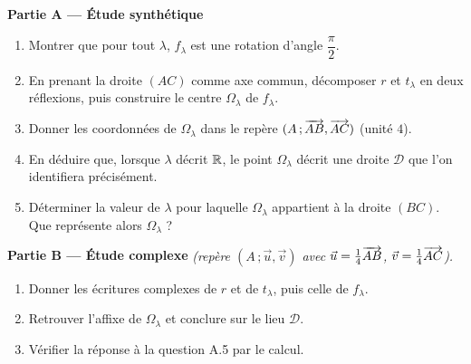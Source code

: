 \textbf{Partie A — Étude synthétique}
\begin{enumerate}
	\item Montrer que pour tout $\lambda$, $f_\lambda$ est une rotation
	d'angle $\dfrac{\pi}{2}$.
	\item En prenant la droite $(AC)$ comme axe commun, décomposer $r$ et
	$t_\lambda$ en deux réflexions, puis construire le centre $\Omega_\lambda$
	de $f_\lambda$.
	\item Donner les coordonnées de $\Omega_\lambda$ dans le repère
	$(A\,;\overrightarrow{AB},\overrightarrow{AC})$ (unité $4$).
	\item En déduire que, lorsque $\lambda$ décrit $\mathbb{R}$, le point
	$\Omega_\lambda$ décrit une droite $\mathscr D$ que l'on identifiera
	précisément.
	\item Déterminer la valeur de $\lambda$ pour laquelle $\Omega_\lambda$
	appartient à la droite $(BC)$. Que représente alors $\Omega_\lambda$ ?
\end{enumerate}

\textbf{Partie B — Étude complexe} \emph{(repère $(A\,;\vec u,\vec v)$ avec
$\vec u = \frac14\overrightarrow{AB}$, $\vec v = \frac14\overrightarrow{AC}$).}
\begin{enumerate}
	\item Donner les écritures complexes de $r$ et de $t_\lambda$, puis celle
	de $f_\lambda$.
	\item Retrouver l'affixe de $\Omega_\lambda$ et conclure sur le lieu
	$\mathscr D$.
	\item Vérifier la réponse à la question A.5 par le calcul.
\end{enumerate}
